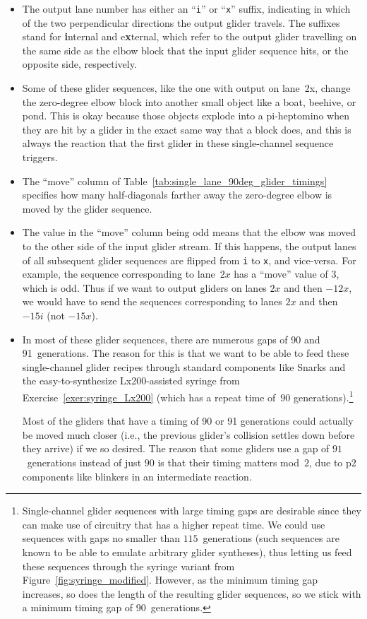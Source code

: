 \begin{itemize}
	\item The output lane number has either an ``\texttt{i}'' or ``\texttt{x}'' suffix, indicating in which of the two perpendicular directions the output glider travels. The suffixes stand for \textbf{i}nternal and e\textbf{x}ternal, which refer to the output glider travelling on the same side as the elbow block that the input glider sequence hits, or the opposite side, respectively.\smallskip 
	
	\item Some of these glider sequences, like the one with output on lane~2x, change the zero-degree elbow block into another small object like a boat, beehive, or pond. This is okay because those objects explode into a pi-heptomino when they are hit by a glider in the exact same way that a block does, and this is always the reaction that the first glider in these single-channel sequence triggers.\smallskip
	
	\item The ``move'' column of Table~\ref{tab:single_lane_90deg_glider_timings} specifies how many half-diagonals farther away the zero-degree elbow is moved by the glider sequence.\smallskip
	
	\item The value in the ``move'' column being odd means that the elbow was moved to the other side of the input glider stream. If this happens, the output lanes of all subsequent glider sequences are flipped from \texttt{i} to \texttt{x}, and vice-versa. For example, the sequence corresponding to lane~$2x$ has a ``move'' value of $3$, which is odd. Thus if we want to output gliders on lanes $2x$ and then $-12x$, we would have to send the sequences corresponding to lanes $2x$ and then $-15i$ (not $-15x$).\smallskip
	
	\item In most of these glider sequences, there are numerous gaps of 90 and 91~generations. The reason for this is that we want to be able to feed these single-channel glider recipes through standard components like Snarks and the easy-to-synthesize Lx200-assisted syringe from Exercise~\ref{exer:syringe_Lx200} (which has a repeat time of~$90$ generations).\footnote{Single-channel glider sequences with large timing gaps are desirable since they can make use of circuitry that has a higher repeat time. We could use sequences with gaps no smaller than $115$~generations (such sequences are known to be able to emulate arbitrary glider syntheses), thus letting us feed these sequences through the syringe variant from Figure~\ref{fig:syringe_modified}. However, as the minimum timing gap increases, so does the length of the resulting glider sequences, so we stick with a minimum timing gap of 90~generations.}
	
	Most of the gliders that have a timing of 90 or 91 generations could actually be moved much closer (i.e., the previous glider's collision settles down before they arrive) if we so desired. The reason that some gliders use a gap of $91$~generations instead of just $90$ is that their timing matters mod~$2$, due to p$2$ components like blinkers in an intermediate reaction.\smallskip
\end{itemize}
